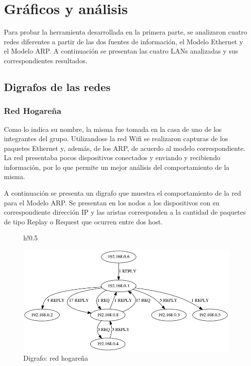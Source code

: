 \section{Gráficos y análisis}
Para probar la herramienta desarrollada en la primera parte, se analizaron cuatro redes diferentes a partir de las dos fuentes de información, el Modelo Ethernet y el Modelo ARP. 
A continuación se presentan las cuatro LANs analizadas y sus correspondientes resultados. 

\subsection{Digrafos de las redes}\label{"Grafos"}

\subsubsection{Red Hogareña}
Como lo indica su nombre, la misma fue tomada en la casa de uno de los integrantes del grupo. Utilizandose la red Wifi se realizaron capturas de los paquetes Ethernet y, además, de los ARP, de acuerdo al modelo correspondiente. La red presentaba pocos dispositivos conectados y enviando y recibiendo información, por lo que permite un mejor análisis del comportamiento de la misma. 

A continuación se presenta un digrafo que muestra el comportamiento de la red para el Modelo ARP. Se presentan en los nodos a los dispositivos con su correspondiente dirección IP y las aristas corresponden a la cantidad de paquetes de tipo Replay o Request que ocurren entre dos host. 

\begin{figure}{h!}{0.5\textwidth}
  \begin{center}
    \includegraphics[width=1\textwidth]{./graficos/grafos-arp/grafo_casa_mari.png}
  \end{center}
  \caption{Digrafo: red hogareña}
\end{figure}

